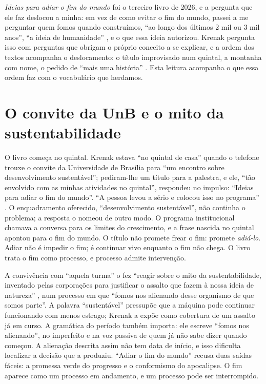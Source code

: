 \documentclass[12pt]{article}
\begin{document}
\emph{Ideias para adiar o fim do mundo} foi o terceiro livro de 2026, e a pergunta que ele faz deslocou a minha: em vez de como evitar o fim do mundo, passei a me perguntar quem fomos quando construímos, ``ao longo dos últimos 2 mil ou 3 mil anos'', ``a ideia de humanidade'' \cite[p. 11]{krenak2019}, e o que essa ideia autorizou. Krenak pergunta isso com perguntas que obrigam o próprio conceito a se explicar, e a ordem dos textos acompanha o deslocamento: o título improvisado num quintal, a montanha com nome, o pedido de ``mais uma história'' \cite[p. 27]{krenak2019}. Esta leitura acompanha o que essa ordem faz com o vocabulário que herdamos.

\section{O convite da UnB e o mito da sustentabilidade}

O livro começa no quintal. Krenak estava ``no quintal de casa'' quando o telefone trouxe o convite da Universidade de Brasília para ``um encontro sobre desenvolvimento sustentável''; pediram-lhe um título para a palestra, e ele, ``tão envolvido com as minhas atividades no quintal'', respondeu no impulso: ``Ideias para adiar o fim do mundo''. ``A pessoa levou a sério e colocou isso no programa'' \cite[p. 15]{krenak2019}. O enquadramento oferecido, ``desenvolvimento sustentável'', não continha o problema; a resposta o nomeou de outro modo. O programa institucional chamava a conversa para os limites do crescimento, e a frase nascida no quintal apontou para o fim do mundo. O título não promete frear o fim: promete \emph{adiá-lo}. Adiar não é impedir o fim; é continuar vivo enquanto o fim não chega. O livro trata o fim como processo, e processo admite intervenção.

A convivência com ``aquela turma'' o fez ``reagir sobre o mito da sustentabilidade, inventado pelas corporações para justificar o assalto que fazem à nossa ideia de natureza'' \cite[p. 16]{krenak2019}, num processo em que ``fomos nos alienando desse organismo de que somos parte''. A palavra ``sustentável'' pressupõe que a máquina pode continuar funcionando com menos estrago; Krenak a expõe como cobertura de um assalto já em curso. A gramática do período também importa: ele escreve ``fomos nos alienando'', no imperfeito e na voz passiva de quem já não sabe dizer quando começou. A alienação descrita assim não tem data de início, e isso dificulta localizar a decisão que a produziu. ``Adiar o fim do mundo'' recusa duas saídas fáceis: a promessa verde do progresso e o conformismo do apocalipse. O fim aparece como um processo em andamento, e um processo pode ser interrompido.
\end{document}
